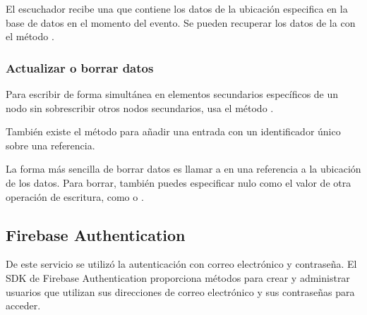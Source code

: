 %
\begin{sphinxVerbatim}[commandchars=\\\{\}]
   
  
\end{sphinxVerbatim}

El escuchador recibe una  que contiene los datos de la ubicación
especifica en la base de datos en el momento del evento. Se pueden recuperar
los datos de la  con el método .


\subsubsection*{Actualizar o borrar datos}
\label{\detokenize{firebase_web:actualizar-o-borrar-datos}}
Para escribir de forma simultánea en elementos secundarios específicos de un
nodo sin sobrescribir otros nodos secundarios, usa el método .

También existe el método  para añadir una entrada con un identificador
único sobre una referencia.

La forma más sencilla de borrar datos es llamar a  en una referencia a
la ubicación de los datos. Para borrar, también puedes especificar nulo como
el valor de otra operación de escritura, como  o .


\subsection*{Firebase Authentication}

De este servicio se utilizó la autenticación con
correo electrónico y contraseña.
El SDK de Firebase Authentication proporciona métodos para crear y administrar usuarios que utilizan sus direcciones de correo electrónico y sus contraseñas para acceder.

